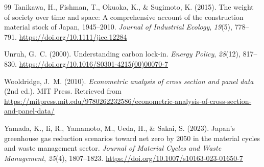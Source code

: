 \documentclass[12pt,a4paper]{article}
\begin{document}
\begin{thebibliography}{99}
Tanikawa, H., Fishman, T., Okuoka, K., \& Sugimoto, K. (2015).
The weight of society over time and space: A comprehensive account of the construction material stock of Japan, 1945--2010.
\emph{Journal of Industrial Ecology}, \emph{19}(5), 778--791.
\url{https://doi.org/10.1111/jiec.12284}

Unruh, G.~C. (2000).
Understanding carbon lock-in.
\emph{Energy Policy}, \emph{28}(12), 817--830.
\url{https://doi.org/10.1016/S0301-4215(00)00070-7}

Wooldridge, J.~M. (2010).
\emph{Econometric analysis of cross section and panel data} (2nd ed.).
MIT Press.
Retrieved from \url{https://mitpress.mit.edu/9780262232586/econometric-analysis-of-cross-section-and-panel-data/}

Yamada, K., Ii, R., Yamamoto, M., Ueda, H., \& Sakai, S. (2023).
Japan's greenhouse gas reduction scenarios toward net zero by 2050 in the material cycles and waste management sector.
\emph{Journal of Material Cycles and Waste Management}, \emph{25}(4), 1807--1823.
\url{https://doi.org/10.1007/s10163-023-01650-7}

\end{thebibliography}
\end{document}
